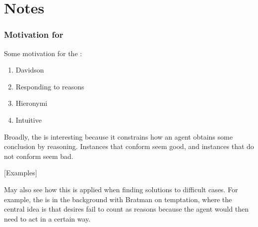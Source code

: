 \chapter{Notes}
\label{cha:notes}

\subsection{Motivation for \ESU{}}
\label{sec:motiv-main-prem}

Some motivation for the \ESU{}:

\begin{enumerate}
\item Davidson
\item Responding to reasons
\item Hieronymi
\item Intuitive
\end{enumerate}

Broadly, the \ESU{} is interesting because it constrains how an agent obtains some conclusion by reasoning.
Instances that conform seem good, and instances that do not conform seem bad.

[Examples]

May also see how this is applied when finding solutions to difficult cases.
For example, the \ESU{} is in the background with Bratman on temptation, where the central idea is that desires fail to count as reasons because the agent would then need to act in a certain way.






